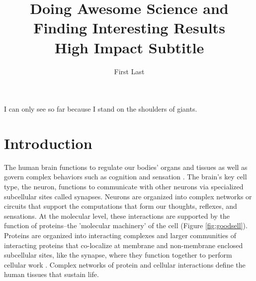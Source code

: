 \documentclass[PhD]{dukethesis}
\author{First Last}
\title{
		\large{Doing Awesome Science and Finding Interesting Results}\\
		\small{High Impact Subtitle}
	}
\begin{document}
\maketitle



\Copyright




\abstract

\lipsum[1]



\acknowledgements

I can only see so far because I stand on the shoulders of giants.

\lipsum[2-3]



\begin{singlespace}
\tableofcontents

\listoffigures

\listoftables
\end{singlespace}





\chapter{Introduction}
\label{chap:01}

The human brain functions to regulate our bodies' organs and tissues as well as
govern complex behaviors such as cognition and sensation \cite{Kandel2012}. The
brain's key cell type, the neuron, functions to communicate with other neurons
via specialized subcellular sites called synapses. Neurons are organized into
complex networks or circuits that support the computations that form our
thoughts, reflexes, and sensations. At the molecular level, these interactions
are supported by the function of proteins--the 'molecular machinery' of the cell
(Figure \ref{fig:goodsell}).  Proteins are organized into interacting complexes
and larger communities of interacting proteins that co-localize at membrane and
non-membrane enclosed subcellular sites, like the synapse, where they function
together to perform cellular work \cite{Alberts2008}. Complex
networks of protein and cellular interactions define the human tissues that
sustain life. 
\end{document}
